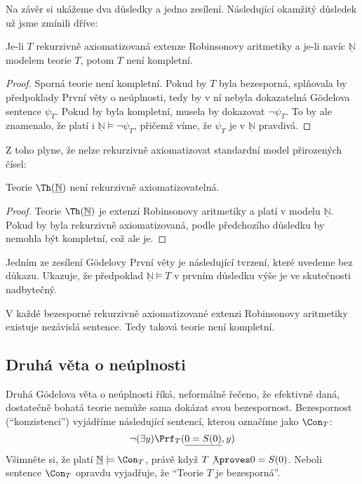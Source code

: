 Na závěr si ukážeme dva důsledky a jedno zesílení. Následující okamžitý důsledek už jsme zmínili dříve:

\begin{corollary}
Je-li $T$ rekurzivně axiomatizovaná extenze Robinsonovy aritmetiky a je-li navíc $\underline{\mathbb N}$ modelem teorie $T$, potom $T$ není kompletní.
\end{corollary}
\begin{proof}
Sporná teorie není kompletní. Pokud by $T$ byla bezesporná, splňovala by předpoklady První věty o neúplnosti, tedy by v ní nebyla dokazatelná Gödelova sentence $\psi_T$. Pokud by byla kompletní, musela by dokazovat $\neg\psi_T$. To by ale znamenalo, že platí i $\underline{\mathbb N}\models\neg\psi_T$, přičemž víme, že $\psi_T$ je v $\underline{\mathbb N}$ pravdivá.  
\end{proof}

Z toho plyne, že nelze rekurzivně axiomatizovat standardní model přirozených čísel:
\begin{corollary}
Teorie $\Th(\underline{\mathbb N})$ není rekurzivně axiomatizovatelná.    
\end{corollary}
\begin{proof}
Teorie $\Th(\underline{\mathbb N})$ je extenzí Robinsonovy aritmetiky a platí v modelu $\underline{\mathbb N}$. Pokud by byla rekurzivně axiomatizovaná, podle předchozího důsledku by nemohla být kompletní, což ale je.
\end{proof}

Jedním ze zesílení Gödelovy První věty je následující tvrzení, které uvedeme bez důkazu. Ukazuje, že předpoklad $\underline{\mathbb N}\models T$ v prvním důsledku výše je ve skutečnosti nadbytečný.

\begin{theorem}
V každé bezesporné rekurzivně axiomatizované extenzi Robinsonovy aritmetiky existuje nezávislá sentence. Tedy taková teorie není kompletní.    
\end{theorem}


\subsection{Druhá věta o neúplnosti}

Druhá Gödelova věta o neúplnosti říká, neformálně řečeno, že efektivně daná, dostatečně bohatá teorie nemůže sama dokázat svou bezespornost. Bezespornost (``konzistenci'') vyjádříme následující sentencí, kterou označíme jako $\Con_T$:
$$
\neg(\exists y)\Prf_T(\underline{0=S(0)},y)
$$
Všimněte si, že platí $\underline{\mathbb N}\models\Con_T$, právě když $T\not\proves 0=S(0)$. Neboli sentence $\Con_T$ opravdu vyjadřuje, že \alert{``Teorie $T$ je bezesporná''.}

